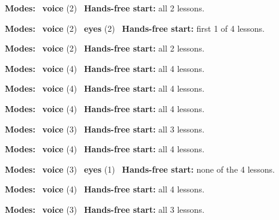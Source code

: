 \expandafter\def\csname hlchaptermodality15\endcsname{%
  {\small\noindent
    \textbf{Modes:} \hlvoicesign{}~\textbf{voice} (2)\quad
    \hlvoicesign{}~\textbf{Hands-free start:} all 2 lessons.%
    \par}\medskip
}

\expandafter\def\csname hlchaptermodality16\endcsname{%
  {\small\noindent
    \textbf{Modes:} \hlvoicesign{}~\textbf{voice} (2) \quad \hlsightsign{}~\textbf{eyes} (2)\quad
    \hlvoicesign{}~\textbf{Hands-free start:} first 1 of 4 lessons.%
    \par}\medskip
}

\expandafter\def\csname hlchaptermodality17\endcsname{%
  {\small\noindent
    \textbf{Modes:} \hlvoicesign{}~\textbf{voice} (2)\quad
    \hlvoicesign{}~\textbf{Hands-free start:} all 2 lessons.%
    \par}\medskip
}

\expandafter\def\csname hlchaptermodality18\endcsname{%
  {\small\noindent
    \textbf{Modes:} \hlvoicesign{}~\textbf{voice} (4)\quad
    \hlvoicesign{}~\textbf{Hands-free start:} all 4 lessons.%
    \par}\medskip
}

\expandafter\def\csname hlchaptermodality19\endcsname{%
  {\small\noindent
    \textbf{Modes:} \hlvoicesign{}~\textbf{voice} (4)\quad
    \hlvoicesign{}~\textbf{Hands-free start:} all 4 lessons.%
    \par}\medskip
}

\expandafter\def\csname hlchaptermodality20\endcsname{%
  {\small\noindent
    \textbf{Modes:} \hlvoicesign{}~\textbf{voice} (4)\quad
    \hlvoicesign{}~\textbf{Hands-free start:} all 4 lessons.%
    \par}\medskip
}

\expandafter\def\csname hlchaptermodality21\endcsname{%
  {\small\noindent
    \textbf{Modes:} \hlvoicesign{}~\textbf{voice} (3)\quad
    \hlvoicesign{}~\textbf{Hands-free start:} all 3 lessons.%
    \par}\medskip
}

\expandafter\def\csname hlchaptermodality22\endcsname{%
  {\small\noindent
    \textbf{Modes:} \hlvoicesign{}~\textbf{voice} (4)\quad
    \hlvoicesign{}~\textbf{Hands-free start:} all 4 lessons.%
    \par}\medskip
}

\expandafter\def\csname hlchaptermodality23\endcsname{%
  {\small\noindent
    \textbf{Modes:} \hlvoicesign{}~\textbf{voice} (3) \quad \hlsightsign{}~\textbf{eyes} (1)\quad
    \hlvoicesign{}~\textbf{Hands-free start:} none of the 4 lessons.%
    \par}\medskip
}

\expandafter\def\csname hlchaptermodality24\endcsname{%
  {\small\noindent
    \textbf{Modes:} \hlvoicesign{}~\textbf{voice} (4)\quad
    \hlvoicesign{}~\textbf{Hands-free start:} all 4 lessons.%
    \par}\medskip
}

\expandafter\def\csname hlchaptermodality25\endcsname{%
  {\small\noindent
    \textbf{Modes:} \hlvoicesign{}~\textbf{voice} (3)\quad
    \hlvoicesign{}~\textbf{Hands-free start:} all 3 lessons.%
    \par}\medskip
}
